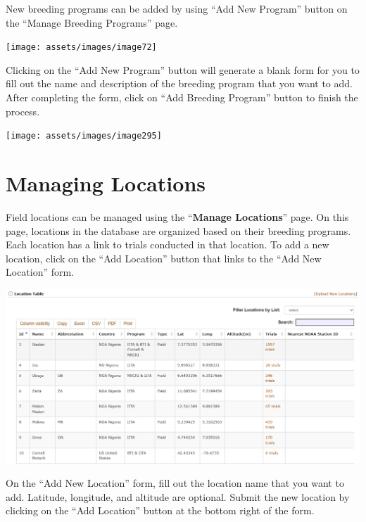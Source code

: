 \documentclass[
  12pt,
]{book}
\begin{document}
New breeding programs can be added by using ``Add New Program'' button on the ``Manage Breeding Programs'' page.

\begin{center}\texttt{[image: assets/images/image72]} \end{center}

Clicking on the ``Add New Program'' button will generate a blank form for you to fill out the name and description of the breeding program that you want to add. After completing the form, click on ``Add Breeding Program'' button to finish the process.

\begin{center}\texttt{[image: assets/images/image295]} \end{center}

\hypertarget{managing-locations}{%
\chapter{Managing Locations}\label{managing-locations}}

Field locations can be managed using the ``\textbf{Manage Locations}'' page. On this page, locations in the database are organized based on their breeding programs. Each location has a link to trials conducted in that location. To add a new location, click on the ``Add Location'' button that links to the ``Add New Location'' form.

\begin{center}\includegraphics[width=0.95\linewidth]{assets/images/image141} \end{center}

On the ``Add New Location'' form, fill out the location name that you want to add. Latitude, longitude, and altitude are optional. Submit the new location by clicking on the ``Add Location'' button at the bottom right of the form.
\end{document}
